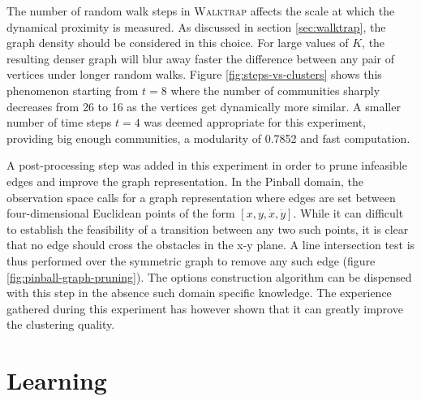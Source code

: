 The number of random walk steps in \textsc{Walktrap} affects the scale at which the dynamical proximity is measured. As discussed in section \ref{sec:walktrap}, the graph density should be considered in this choice. For large values of $K$, the resulting denser graph will blur away faster the difference between any pair of vertices under longer random walks. Figure \ref{fig:steps-vs-clusters} shows this phenomenon starting from $t=8$ where the number of communities sharply decreases from 26 to 16 as the vertices get dynamically more similar. A smaller number of time steps $t=4$ was deemed appropriate for this experiment, providing big enough communities, a modularity of 0.7852 and fast computation.

A post-processing step was added in this experiment in order to prune infeasible edges and improve the graph representation. In the Pinball domain, the observation space calls for a graph representation where edges are set between four-dimensional Euclidean points of the form $[x, y, \dot{x}, \dot{y}]$. While it can difficult to establish the feasibility of a transition between any two such points, it is clear that no edge should cross the obstacles in the x-y plane. A line intersection test is thus performed over the symmetric graph to remove any such edge (figure \ref{fig:pinball-graph-pruning}). The options construction algorithm can be dispensed with this step in the absence such domain specific knowledge. The experience gathered during this experiment has however shown that it can greatly improve the clustering quality.

\section{Learning}

